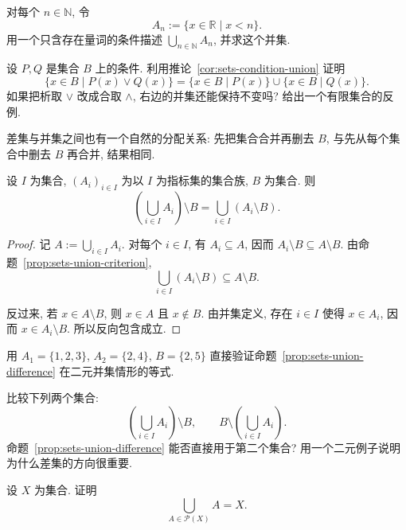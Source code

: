 \documentclass[usesamecnt, thmcnt=section, lang=cn, newtx, 10pt, scheme=chinese]{elegantbook}
\begin{document}
\begin{exercise}\label{ex:sets-union-builder-01}
对每个 $n\in\mathbb N$, 令
\[
 A_n:=\{x\in\mathbb R\mid x<n\}.
\]
用一个只含存在量词的条件描述 $\bigcup_{n\in\mathbb N}A_n$, 并求这个并集.
\end{exercise}

\begin{exercise}\label{ex:sets-union-builder-02}
设 $P ,Q $ 是集合 $B$ 上的条件. 利用推论~\ref{cor:sets-condition-union} 证明
\[
 \{x\in B\mid P(x)\vee Q(x)\}
 =
 \{x\in B\mid P(x)\}\cup\{x\in B\mid Q(x)\}.
\]
如果把析取 $\vee$ 改成合取 $\wedge$, 右边的并集还能保持不变吗? 给出一个有限集合的反例.
\end{exercise}

差集与并集之间也有一个自然的分配关系: 先把集合合并再删去 $B$, 与先从每个集合中删去 $B$ 再合并, 结果相同.

\begin{proposition}\label{prop:sets-union-difference}
设 $I$ 为集合, $(A_i)_{i\in I}$ 为以 $I$ 为指标集的集合族, $B$ 为集合. 则
\[
 \left(\bigcup_{i\in I}A_i\right)\setminus B
 =
 \bigcup_{i\in I}(A_i\setminus B).
\]
\end{proposition}

\begin{proof}
记 $A:=\bigcup_{i\in I}A_i$. 对每个 $i\in I$, 有 $A_i\subseteq A$, 因而 $A_i\setminus B\subseteq A\setminus B$. 由命题~\ref{prop:sets-union-criterion},
\[
 \bigcup_{i\in I}(A_i\setminus B)\subseteq A\setminus B.
\]

反过来, 若 $x\in A\setminus B$, 则 $x\in A$ 且 $x\notin B$. 由并集定义, 存在 $i\in I$ 使得 $x\in A_i$, 因而 $x\in A_i\setminus B$. 所以反向包含成立.
\end{proof}

\begin{exercise}\label{ex:sets-union-diff-01}
用 $A_1=\{1,2,3\}$, $A_2=\{2,4\}$, $B=\{2,5\}$ 直接验证命题~\ref{prop:sets-union-difference} 在二元并集情形的等式.
\end{exercise}

\begin{exercise}\label{ex:sets-union-diff-02}
比较下列两个集合:
\[
 \left(\bigcup_{i\in I}A_i\right)\setminus B,
 \qquad
 B\setminus\left(\bigcup_{i\in I}A_i\right).
\]
命题~\ref{prop:sets-union-difference} 能否直接用于第二个集合? 用一个二元例子说明为什么差集的方向很重要.
\end{exercise}

\begin{challenge}\label{ch:sets-05}
设 $X$ 为集合. 证明
\[
 \bigcup_{A\in\mathscr P(X)}A=X.
\]
\end{challenge}
\end{document}
